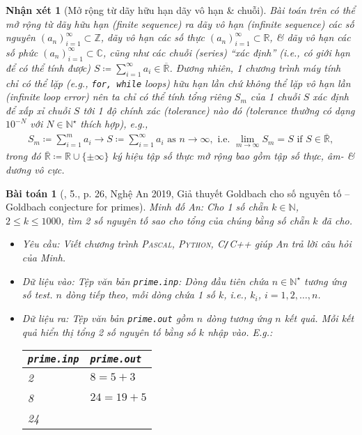 \documentclass{article}
\newtheorem{baitoan}{Bài toán}
\newtheorem{nhanxet}{Nhận xét}
\begin{document}
\begin{nhanxet}[Mở rộng từ dãy hữu hạn dãy vô hạn \& chuỗi]
	Bài toán trên có thể mở rộng từ dãy hữu hạn (finite sequence) ra dãy vô hạn (infinite sequence) các số nguyên $(a_n)_{i=1}^\infty\subset\mathbb{Z}$, dãy vô hạn các số thực $(a_n)_{i=1}^\infty\subset\mathbb{R}$, \& dãy vô hạn các số phức $(a_n)_{i=1}^\infty\subset\mathbb{C}$, cũng như các chuỗi (series) ``xác định'' (i.e., có giới hạn để có thể tính được) $S\coloneqq\sum_{i=1}^\infty a_i\in\overline{\mathbb{R}}$. Đương nhiên, 1 chương trình máy tính chỉ có thể lặp (e.g., \texttt{for, while} loops) hữu hạn lần chứ không thể lặp vô hạn lần (infinite loop error) nên ta chỉ có thể tính tổng riêng $S_m$ của 1 chuỗi $S$ xác định để xấp xỉ chuỗi $S$ tới 1 độ chính xác (tolerance) nào đó (tolerance thường có dạng $10^{-N}$ với $N\in\mathbb{N}^\star$ thích hợp), e.g.,
	\begin{align*}
		S_m\coloneqq\sum_{i=1}^m a_i\to S\coloneqq\sum_{i=1}^\infty a_i\mbox{ as } n\to\infty,\mbox{ i.e. } \lim_{m\to\infty} S_m = S\mbox{ if } S\in\overline{\mathbb{R}},
	\end{align*}
	trong đó $\overline{\mathbb{R}}\coloneqq\mathbb{R}\cup\{\pm\infty\}$ ký hiệu tập số thực mở rộng bao gồm tập số thực, âm- \& dương vô cực.
\end{nhanxet}

\begin{baitoan}[\cite{VietSTEM2021}, 5., p. 26, Nghệ An 2019, Giả thuyết Goldbach cho số nguyên tố -- Goldbach conjecture for primes]
	Minh đố An: Cho 1 số chẵn $k\in\mathbb{N}$, $2\le k\le1000$, tìm 2 số nguyên tố sao cho tổng của chúng bằng số chẵn $k$ đã cho.
	\begin{itemize}
		\item {\sf Yêu cầu:} Viết chương trình \textsc{Pascal, Python, C\texttt{/}C++} giúp An trả lời câu hỏi của Minh.
		\item {\sf Dữ liệu vào:} Tệp văn bản \verb|prime.inp|: Dòng đầu tiên chứa $n\in\mathbb{N}^\star$ tương ứng số test. $n$ dòng tiếp theo, mỗi dòng chứa 1 số $k$, i.e., $k_i$, $i = 1,2,\ldots,n$.
		\item {\sf Dữ liệu ra:} Tệp văn bản \verb|prime.out| gồm $n$ dòng tương ứng $n$ kết quả. Mỗi kết quả hiển thị tổng 2 số nguyên tố bằng số $k$ nhập vào. E.g.:
		\begin{table}[H]
			\centering
			\begin{tabular}{|l|l|}
				\hline
				\texttt{prime.inp} & \texttt{prime.out} \\
				\hline
				2 & $8 = 5 + 3$ \\
				8 & $24 = 19 + 5$ \\
				24 & \\
				\hline
			\end{tabular}
		\end{table}
	\end{itemize}
\end{baitoan}
\end{document}
